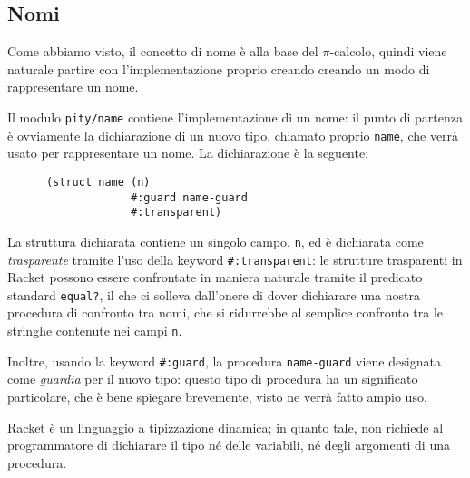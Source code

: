 \subsection{Nomi}

Come abbiamo visto, il concetto di nome \`e alla base del $\pi$-calcolo,
quindi viene naturale partire con l'implementazione proprio creando creando
un modo di rappresentare un nome.

Il modulo \lstinline{pity/name} contiene l'implementazione di un nome: il
punto di partenza \`e ovviamente la dichiarazione di un nuovo tipo, chiamato
proprio \lstinline{name}, che verr\`a usato per rappresentare un nome. La
dichiarazione \`e la seguente:

\begin{lstlisting}
      (struct name (n)
                   #:guard name-guard
                   #:transparent)
\end{lstlisting}

La struttura dichiarata contiene un singolo campo, \lstinline{n}, ed \`e
dichiarata come \emph{trasparente} tramite l'uso della keyword
\lstinline{#:transparent}: le strutture trasparenti in Racket possono essere
confrontate in maniera naturale tramite il predicato standard
\lstinline{equal?}, il che ci solleva dall'onere di dover dichiarare una
nostra procedura di confronto tra nomi, che si ridurrebbe al semplice
confronto tra le stringhe contenute nei campi \lstinline{n}.

Inoltre, usando la keyword \lstinline{#:guard}, la procedura
\lstinline{name-guard} viene designata come \emph{guardia} per il nuovo
tipo: questo tipo di procedura ha un significato particolare, che \`e bene
spiegare brevemente, visto ne verr\`a fatto ampio uso.

Racket \`e un linguaggio a tipizzazione dinamica; in quanto tale, non
richiede al programmatore di dichiarare il tipo n\'e delle variabili, n\'e
degli argomenti di una procedura.
